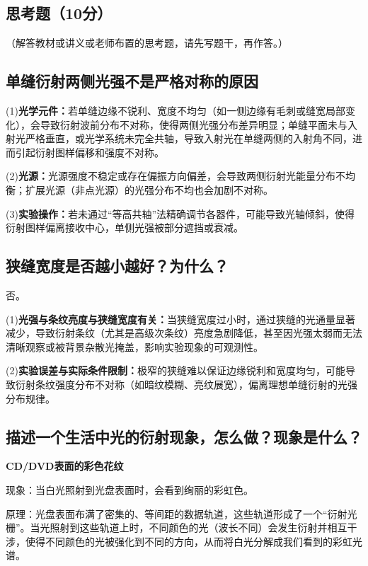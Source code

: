 \documentclass[]{../模板/Report}%
\begin{document}
\begin{fullreportonly}
\section{思考题（10分）}
（解答教材或讲义或老师布置的思考题，请先写题干，再作答。）
\subsection{单缝衍射两侧光强不是严格对称的原因}
(1)\textbf{光学元件：}若单缝边缘不锐利、宽度不均匀（如一侧边缘有毛刺或缝宽局部变化），会导致衍射波前分布不对称，使得两侧光强分布差异明显；单缝平面未与入射光严格垂直，或光学系统未完全共轴，导致入射光在单缝两侧的入射角不同，进而引起衍射图样偏移和强度不对称。
\par

(2)\textbf{光源：}光源强度不稳定或存在偏振方向偏差，会导致两侧衍射光能量分布不均衡；扩展光源（非点光源）的光强分布不均也会加剧不对称。
\par

(3)\textbf{实验操作：}若未通过“等高共轴”法精确调节各器件，可能导致光轴倾斜，使得衍射图样偏离接收中心，单侧光强被部分遮挡或衰减。

\subsection{狭缝宽度是否越小越好？为什么？}
否。
\par
(1)\textbf{光强与条纹亮度与狭缝宽度有关：}当狭缝宽度过小时，通过狭缝的光通量显著减少，导致衍射条纹（尤其是高级次条纹）亮度急剧降低，甚至因光强太弱而无法清晰观察或被背景杂散光掩盖，影响实验现象的可观测性。
\par

(2)\textbf{实验误差与实际条件限制：}极窄的狭缝难以保证边缘锐利和宽度均匀，可能导致衍射条纹强度分布不对称（如暗纹模糊、亮纹展宽），偏离理想单缝衍射的光强分布规律。

\subsection{描述一个生活中光的衍射现象，怎么做？现象是什么？}
\textbf{CD/DVD表面的彩色花纹}
\par
现象：当白光照射到光盘表面时，会看到绚丽的彩虹色。
\par
原理：光盘表面布满了密集的、等间距的数据轨道，这些轨道形成了一个“衍射光栅”。当光照射到这些轨道上时，不同颜色的光（波长不同）会发生衍射并相互干涉，使得不同颜色的光被强化到不同的方向，从而将白光分解成我们看到的彩虹光谱。
\end{fullreportonly}
\insertnotes
\end{document}
